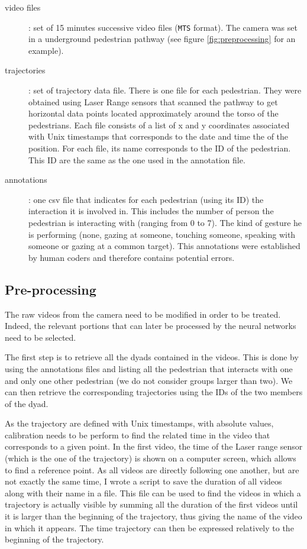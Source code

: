 \documentclass[12pt,a4paper,twoside]{article}
\begin{document}
\begin{description}
    \item[video files]: set of 15 minutes successive video files (\texttt{MTS} format). The camera was set in a underground pedestrian pathway (see figure \ref{fig:preprocessing} for an example).
    \item[trajectories]: set of trajectory data file. There is one file for each pedestrian. They were obtained using Laser Range sensors that scanned the pathway to get horizontal data points located approximately around the torso of the pedestrians. Each file consists of a list of x and y coordinates associated with Unix timestamps that corresponds to the date and time the of the position. For each file, its name corresponds to the ID of the pedestrian. This ID are the same as the one used in the annotation file.
    \item[annotations]: one csv file that indicates for each pedestrian (using its ID) the interaction it is involved in. This includes the number of person the pedestrian is interacting with (ranging from 0 to 7). The kind of gesture he is performing (none, gazing at someone, touching someone, speaking with someone or gazing at a common target). This annotations were established by human coders and therefore contains potential errors.
\end{description}

\subsection{Pre-processing}
The raw videos from the camera need to be modified in order to be treated. Indeed, the relevant portions that can later be processed by the neural networks need to be selected. 

The first step is to retrieve all the dyads contained in the videos. This is done by using the annotations files and listing all the pedestrian that interacts with one and only one other pedestrian (we do not consider groups larger than two). We can then retrieve the corresponding trajectories using the IDs of the two members of the dyad.

As the trajectory are defined with Unix timestamps, with absolute values, calibration needs to be perform to find the related time in the video that corresponds to a given point. In the first video, the time of the Laser range sensor (which is the one of the trajectory) is shown on a computer screen, which allows to find a reference point. As all videos are directly following one another, but are not exactly the same time, I wrote a script to save the duration of all videos along with their name in a file. This file can be used to find the videos in which a trajectory is actually visible by summing all the duration of the first videos until it is larger than the beginning of the trajectory, thus giving the name of the video in which it appears. The time trajectory can then be expressed relatively to the beginning of the trajectory. 
\end{document}
